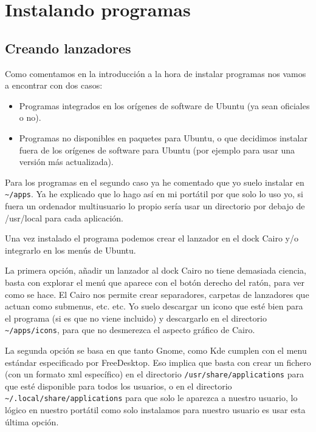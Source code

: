 \section{Instalando programas}\label{instalando-programas}

\subsection{Creando lanzadores}\label{creando-lanzadores}

Como comentamos en la introducción a la hora de instalar programas nos
vamos a encontrar con dos casos:

\begin{itemize}
\item
  Programas integrados en los orígenes de software de Ubuntu (ya sean
  oficiales o no).
\item
  Programas no disponibles en paquetes para Ubuntu, o que decidimos
  instalar fuera de los orígenes de software para Ubuntu (por ejemplo
  para usar una versión más actualizada).
\end{itemize}

Para los programas en el segundo caso ya he comentado que yo suelo
instalar en \texttt{\textasciitilde{}/apps}. Ya he explicado que lo hago
así en mi portátil por que solo lo uso yo, si fuera un ordenador
multiusuario lo propio sería usar un directorio por debajo de /usr/local
para cada aplicación.

Una vez instalado el programa podemos crear el lanzador en el dock Cairo
y/o integrarlo en los menús de Ubuntu.

La primera opción, añadir un lanzador al dock Cairo no tiene demasiada
ciencia, basta con explorar el menú que aparece con el botón derecho del
ratón, para ver como se hace. El Cairo nos permite crear separadores,
carpetas de lanzadores que actuan como submenus, etc. etc. Yo suelo
descargar un icono que esté bien para el programa (si es que no viene
incluido) y descargarlo en el directorio
\texttt{\textasciitilde{}/apps/icons}, para que no desmerezca el aspecto
gráfico de Cairo.

La segunda opción se basa en que tanto Gnome, como Kde cumplen con el
menu estándar especificado por FreeDesktop. Eso implica que basta con
crear un fichero (con un formato xml específico) en el directorio
\texttt{/usr/share/applications} para que esté disponible para todos los
usuarios, o en el directorio
\texttt{\textasciitilde{}/.local/share/applications} para que solo le
aparezca a nuestro usuario, lo lógico en nuestro portátil como solo
instalamos para nuestro usuario es usar esta última opción.

